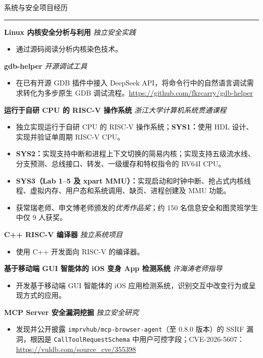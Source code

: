 \documentclass{resume} %
\renewenvironment{rSection}[1]{
\sectionskip
\textcolor{CarnegieMellonRed}{\MakeUppercase{#1}}
\sectionlineskip
\hrule
\begin{list}{}{\setlength{\leftmargin}{1.5em}}
\item[]
}{\end{list}}
\begin{document}
\begin{rSection}{系统与安全项目经历}
\textbf{Linux 内核安全分析与利用} \hfill \textit{独立安全实践}\\
\begin{itemize}
    \item 通过源码阅读分析内核染色技术。
\end{itemize}

\textbf{gdb-helper} \hfill \textit{开源调试工具}\\
\begin{itemize}
    \item 在已有开源 GDB 插件中接入 DeepSeek API，将命令行中的自然语言调试需求转化为多步原生 GDB 调试流程。\url{https://github.com/fkrcarry/gdb-helper}
\end{itemize}

\textbf{运行于自研 CPU 的 RISC-V 操作系统} \hfill \textit{浙江大学计算机系统贯通课程}\\
\begin{itemize}
    \item 独立实现运行于自研 CPU 的 RISC-V 操作系统；\textbf{SYS1：}使用 HDL 设计、实现并验证单周期 RISC-V CPU。
    \item \textbf{SYS2：}实现支持中断和进程上下文切换的简易内核；实现支持五级流水线、分支预测、总线接口、转发、一级缓存和特权指令的 RV64I CPU。
    \item \textbf{SYS3（Lab 1--5 及 xpart MMU）：}实现启动和时钟中断、抢占式内核线程、虚拟内存、用户态和系统调用、缺页、进程创建及 MMU 功能。
    \item 获常瑞老师、申文博老师颁发的\textit{优秀作品奖}；约 150 名信息安全和图灵班学生中仅 9 人获奖。
\end{itemize}

\textbf{C++ RISC-V 编译器} \hfill \textit{独立系统项目}\\
\begin{itemize}
    \item 使用 C++ 开发面向 RISC-V 的编译器。
\end{itemize}

\textbf{基于移动端 GUI 智能体的 iOS 变身 App 检测系统} \hfill \textit{许海涛老师指导}\\
\begin{itemize}
    \item 开发基于移动端 GUI 智能体的 iOS 应用检测系统，识别交互中改变行为或呈现方式的应用。
\end{itemize}

\textbf{MCP Server 安全漏洞挖掘} \hfill \textit{独立安全研究}\\
\begin{itemize}
    \item 发现并公开披露 \texttt{imprvhub/}\allowbreak\texttt{mcp-browser-agent}（至 0.8.0 版本）的 SSRF 漏洞，根因是 \texttt{CallToolRequestSchema} 中用户可控字段；CVE-2026-5607：\url{https://vuldb.com/source_cve/355398}
\end{itemize}


\end{rSection}
\end{document}
